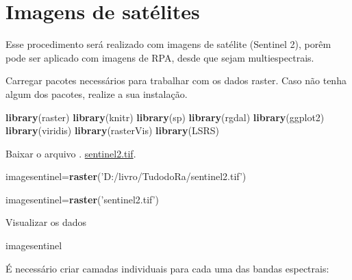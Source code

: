 \documentclass[
]{book}
\newenvironment{Shaded}{\begin{snugshade}}{\end{snugshade}}
\newcommand{\KeywordTok}[1]{\textcolor[rgb]{0.13,0.29,0.53}{\textbf{#1}}}
\newcommand{\NormalTok}[1]{#1}
\newcommand{\StringTok}[1]{\textcolor[rgb]{0.31,0.60,0.02}{#1}}
\begin{document}
\hypertarget{imagens-de-satuxe9lites}{%
\section{Imagens de satélites}\label{imagens-de-satuxe9lites}}

Esse procedimento será realizado com imagens de satélite (Sentinel 2), porêm pode ser aplicado com imagens de RPA, desde que sejam multiespectrais.

Carregar pacotes necessários para trabalhar com os dados raster.
Caso não tenha algum dos pacotes, realize a sua instalação.

\begin{Shaded}
\begin{Highlighting}[]
\KeywordTok{library}\NormalTok{(raster)}
\KeywordTok{library}\NormalTok{(knitr)}
\KeywordTok{library}\NormalTok{(sp)}
\KeywordTok{library}\NormalTok{(rgdal)}
\KeywordTok{library}\NormalTok{(ggplot2)}
\KeywordTok{library}\NormalTok{(viridis)}
\KeywordTok{library}\NormalTok{(rasterVis)}
\KeywordTok{library}\NormalTok{(LSRS)}
\end{Highlighting}
\end{Shaded}

Baixar o arquivo . \href{https://www.dropbox.com/s/s08rizfs6wls9ml/sentinel2.tif?dl=1}{sentinel2.tif}.

\begin{Shaded}
\begin{Highlighting}[]
\NormalTok{imagesentinel=}\KeywordTok{raster}\NormalTok{(}\StringTok{'D:/livro/TudodoRa/sentinel2.tif'}\NormalTok{)}
\end{Highlighting}
\end{Shaded}

\begin{Shaded}
\begin{Highlighting}[]
\NormalTok{imagesentinel=}\KeywordTok{raster}\NormalTok{(}\StringTok{'sentinel2.tif'}\NormalTok{)}
\end{Highlighting}
\end{Shaded}

Visualizar os dados

\begin{Shaded}
\begin{Highlighting}[]
\NormalTok{imagesentinel}
\end{Highlighting}
\end{Shaded}

É necessário criar camadas individuais para cada uma das bandas espectrais:
\end{document}
